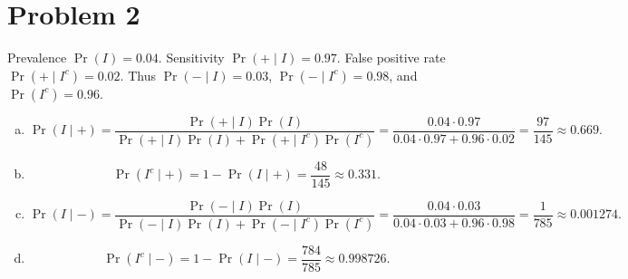 \section*{Problem 2}

Prevalence \(\Pr(I)=0.04\). Sensitivity \(\Pr(+\mid I)=0.97\). False positive rate \(\Pr(+\mid I^c)=0.02\).
Thus \(\Pr(-\mid I)=0.03\), \(\Pr(-\mid I^c)=0.98\), and \(\Pr(I^c)=0.96\).

\begin{enumerate}[(a)]
\item
\[
\Pr(I\mid +)=\frac{\Pr(+\mid I)\Pr(I)}{\Pr(+\mid I)\Pr(I)+\Pr(+\mid I^c)\Pr(I^c)}
=\frac{0.04\cdot 0.97}{0.04\cdot 0.97+0.96\cdot 0.02}
=\frac{97}{145}\approx 0.669.
\]

\item
\[
\Pr(I^c\mid +)=1-\Pr(I\mid +)=\frac{48}{145}\approx 0.331.
\]

\item
\[
\Pr(I\mid -)=\frac{\Pr(-\mid I)\Pr(I)}{\Pr(-\mid I)\Pr(I)+\Pr(-\mid I^c)\Pr(I^c)}
=\frac{0.04\cdot 0.03}{0.04\cdot 0.03+0.96\cdot 0.98}
=\frac{1}{785}\approx 0.001274.
\]

\item
\[
\Pr(I^c\mid -)=1-\Pr(I\mid -)=\frac{784}{785}\approx 0.998726.
\]
\end{enumerate}
